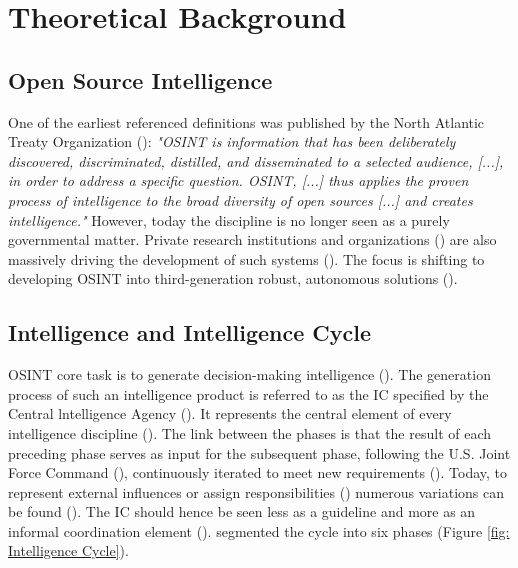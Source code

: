 \documentclass[10pt]{article}
\begin{document}
\section{Theoretical Background} \label{sec:theoreticalbackground}


\subsection{Open Source Intelligence}

One of the earliest referenced definitions
was published by the North Atlantic Treaty Organization (\textcite{NorthAtlanticTreatyOrganization.2001}): \textit{"OSINT is information that has been
    deliberately discovered, discriminated, distilled, and disseminated to a selected audience,
    [...], in order to address a specific question. OSINT, [...] thus applies the proven
    process of intelligence to the broad diversity of open sources [...] and creates
    intelligence."} However, today the discipline is no longer seen as a purely governmental
matter. Private research institutions and organizations (\cite{Bohm.2021}) are
also massively driving the development of such systems
(\cite{Dokman.2020}). The focus is shifting to
developing OSINT into third-generation robust, autonomous solutions (\cite{PastorGalindo.2019}).

\subsection{Intelligence and Intelligence Cycle}

OSINT core task is to generate decision-making intelligence
(\cite{NorthAtlanticTreatyOrganization.2001}). The generation process of such an intelligence product
is referred to as the IC specified by the Central lntelligence Agency (\cite{CentralIntelligenceAgency.1987}).
It represents the central element of every intelligence discipline (\cite{Reuser.2017}).
The link between the phases is that the result of each preceding phase serves as input for the subsequent phase, following the U.S. Joint Force Command (\cite{JointChiefsofStaffU.S.Army.2013}), continuously iterated to meet new requirements (\cite{Gibson.2016}).
Today, to represent external influences or assign responsibilities (\cite{Lowenthal.2020,Phythian.2013}) numerous
variations can be found (\cite{Reuser.2017}). The IC should hence be seen less as a guideline and more as an informal
coordination element (\cite{Hwang.2022}). \textcite{JointChiefsofStaffU.S.Army.2013} segmented the cycle into six phases (Figure \ref{fig: Intelligence Cycle}).
\end{document}
